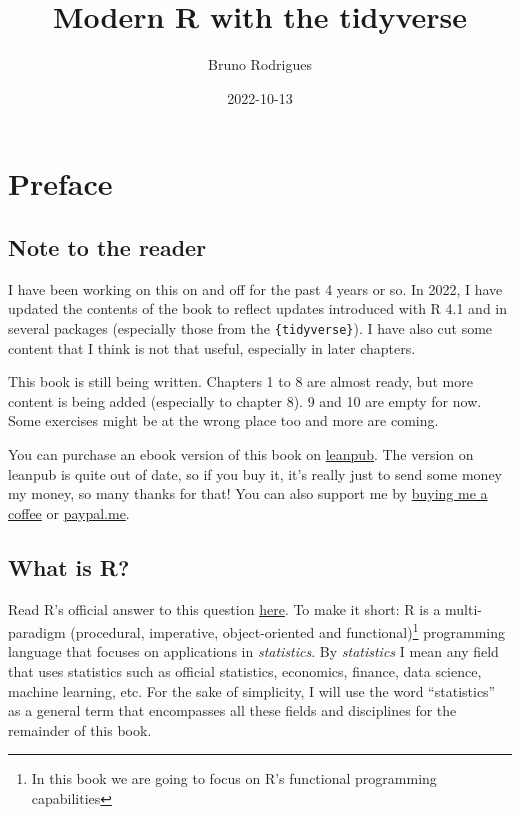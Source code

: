 \documentclass[
]{article}
\title{Modern R with the tidyverse}
\author{Bruno Rodrigues}
\date{2022-10-13}
\begin{document}
\maketitle

{
\setcounter{tocdepth}{2}
\tableofcontents
}
\hypertarget{preface}{%
\section*{Preface}\label{preface}}

\hypertarget{note-to-the-reader}{%
\subsection*{Note to the reader}\label{note-to-the-reader}}

I have been working on this on and off for the past 4 years or so. In 2022, I have updated the
contents of the book to reflect updates introduced with R 4.1 and in several packages (especially
those from the \texttt{\{tidyverse\}}). I have also cut some content that I think is not that useful,
especially in later chapters.

This book is still being written. Chapters 1 to 8 are almost ready, but more content is being added
(especially to chapter 8). 9 and 10 are empty for now. Some exercises might be at the wrong place
too and more are coming.

You can purchase an ebook version of this book on \href{https://leanpub.com/modern_tidyverse}{leanpub}.
The version on leanpub is quite out of date, so if you buy it, it's really just to send some money
my money, so many thanks for that! You can also support me by \href{https://www.buymeacoffee.com/brodriguesco}{buying me a
coffee} or
\href{https://www.paypal.me/brodriguesco}{paypal.me}.

\hypertarget{what-is-r}{%
\subsection*{What is R?}\label{what-is-r}}

Read R's official answer to this question
\href{https://cran.r-project.org/doc/FAQ/R-FAQ.html\#What-is-R_003f}{here}. To make it short: R is a
multi-paradigm (procedural, imperative, object-oriented and functional)\footnote{In this book we are going
  to focus on R's functional programming capabilities} programming language that
focuses on applications in \emph{statistics}. By \emph{statistics} I mean any field that uses statistics such
as official statistics, economics, finance, data science, machine learning, etc. For the sake of
simplicity, I will use the word ``statistics'' as a general term that encompasses all these fields and
disciplines for the remainder of this book.
\end{document}
